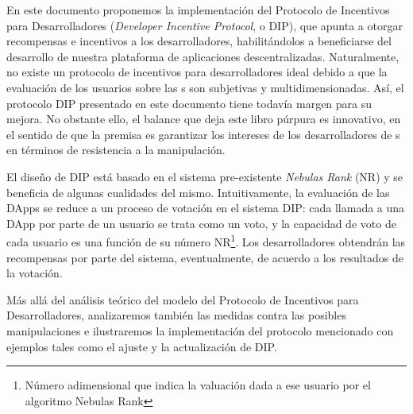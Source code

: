 En este documento proponemos la implementación del Protocolo de Incentivos para Desarrolladores (\textit{Developer Incentive Protocol}, o DIP), que apunta a otorgar recompensas e incentivos a los desarrolladores, habilitándolos a beneficiarse del desarrollo de nuestra plataforma de aplicaciones descentralizadas. Naturalmente, no existe un protocolo de incentivos para desarrolladores ideal debido a que la evaluación de los usuarios sobre las  {\dapp}s son subjetivas y multidimensionadas. Así, el protocolo DIP presentado en este documento tiene todavía margen para su mejora. No obstante ello, el balance que deja este libro púrpura es innovativo, en el sentido de que la premisa es garantizar los intereses de los desarrolladores de {\dapp}s en términos de resistencia a la manipulación.

El diseño de DIP está basado en el sistema pre-existente \textit{Nebulas Rank}
(NR)\cite{Nebulasyellowpaper} y se beneficia de algunas cualidades del mismo. Intuitivamente, la evaluación de las DApps se reduce a un proceso de votación en el sistema DIP: cada llamada a una DApp por parte de un usuario se trata como un voto, y la capacidad de voto de cada usuario es una función de su número NR\footnote{Número adimensional que indica la valuación dada a ese usuario por el algoritmo Nebulas Rank}. Los desarrolladores obtendrán las recompensas por parte del sistema, eventualmente, de acuerdo a los resultados de la votación.

Más allá del análisis teórico del modelo del Protocolo de Incentivos para Desarrolladores, analizaremos también las medidas contra las posibles manipulaciones e ilustraremos la implementación del protocolo mencionado con ejemplos tales como el ajuste y la actualización de DIP\@.

